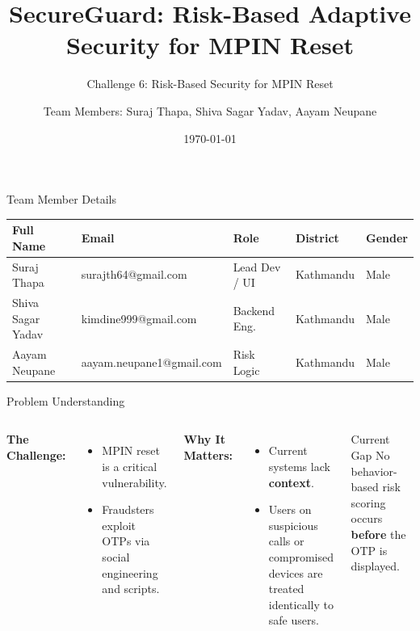 \documentclass[aspectratio=169, 10pt]{beamer}
\title[SecureGuard]{SecureGuard: Risk-Based Adaptive Security for MPIN Reset}
\subtitle{Challenge 6: Risk-Based Security for MPIN Reset}
\date{\today}
\begin{document}
\begin{frame}
    \titlepage
\end{frame}

\author[Suraj, Sagar, Aayam]{Team Members: Suraj Thapa, Shiva Sagar Yadav, Aayam Neupane}

\begin{frame}{Team Member Details}
    \begin{table}
        \centering
        \footnotesize
        \begin{tabular}{|l|l|l|l|l|}
            \hline
            \textbf{Full Name} & \textbf{Email} & \textbf{Role} & \textbf{District} & \textbf{Gender} \\ \hline
            Suraj Thapa         & surajth64@gmail.com        & Lead Dev / UI & Kathmandu        & Male             \\ \hline
            Shiva Sagar Yadav   & kimdine999@gmail.com      & Backend Eng.  & Kathmandu        & Male             \\ \hline
            Aayam Neupane       & aayam.neupane1@gmail.com  & Risk Logic    & Kathmandu        & Male             \\ \hline
        \end{tabular}
    \end{table}
\end{frame}

\begin{frame}{Problem Understanding}
    \begin{columns}
        \textbf{The Challenge:}
        \begin{itemize}
            \item MPIN reset is a critical vulnerability.
            \item Fraudsters exploit OTPs via social engineering and scripts.
        \end{itemize}

        \vspace{0.5cm}
        \textbf{Why It Matters:}
        \begin{itemize}
            \item Current systems lack \textbf{context}.
            \item Users on suspicious calls or compromised devices are treated identically to safe users.
        \end{itemize}

        \begin{alertblock}{Current Gap}
            No behavior-based risk scoring occurs \textbf{before} the OTP is displayed.
        \end{alertblock}
    \end{columns}
\end{frame}
\end{document}
